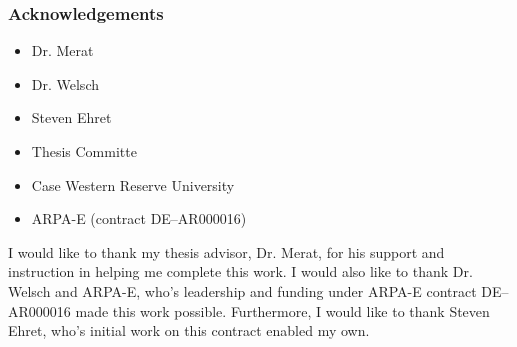 \ifisPPT
\begin{frame}
  \frametitle{Acknowledgements}
    \begin{itemize}
        \item Dr. Merat
        \item Dr. Welsch
        \item Steven Ehret
        \item Thesis Committe
        \item Case Western Reserve University
        \item ARPA-E (contract DE--AR000016)
    \end{itemize}
\end{frame}
\else
I would like to thank my thesis advisor, Dr. Merat, for his support and instruction in helping me complete this work. I would also like to thank Dr. Welsch and ARPA-E, who's leadership and funding under ARPA-E contract DE--AR000016 made this work possible. Furthermore, I would like to thank Steven Ehret, who's initial work on this contract enabled my own.
\fi

